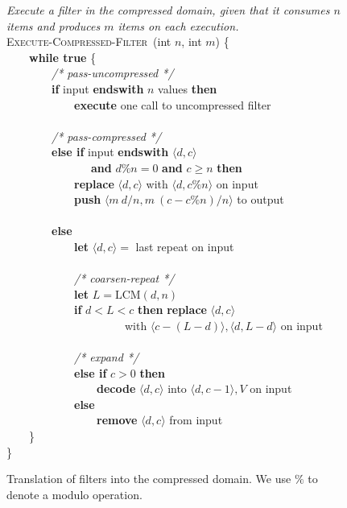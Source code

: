 \newcommand{\mynewline}[0]{\\}
\begin{figure}[t]
\vspace{-6pt}
\centering
\begin{minipage}{0.62\textwidth}
{\it Execute a filter in the compressed domain, given that it consumes
  $n$ items and produces $m$ items on each execution.}\mynewline
\textsc{Execute-Compressed-Filter}~(int $n$, int $m$) \{\mynewline
\mbox{~~~~}{\bf while true} \{\mynewline
\mbox{~~~~}\mbox{~~~~}{\it /* pass-uncompressed */} \mynewline
\mbox{~~~~}\mbox{~~~~}{\bf if} input {\bf endswith} $n$ values {\bf then}\mynewline
\mbox{~~~~}\mbox{~~~~}\mbox{~~~~}{\bf execute} one call to uncompressed filter\mynewline
\mbox{~~~~}\mbox{~~~~}~\mynewline
\mbox{~~~~}\mbox{~~~~}{\it /* pass-compressed */} \mynewline
\mbox{~~~~}\mbox{~~~~}{\bf else if} input {\bf endswith} $\langle d,c \rangle$\mynewline
\mbox{~~~~}\mbox{~~~~}\mbox{~~~~~~~}{\bf and} $d\%n = 0$ {\bf and} $c \geq n$ {\bf then}\mynewline
\mbox{~~~~}\mbox{~~~~}\mbox{~~~~}{\bf replace} $\langle d,c \rangle$ with $\langle d, c\%n\rangle$ on input\mynewline
\mbox{~~~~}\mbox{~~~~}\mbox{~~~~}{\bf push} $\langle m~d/n, m~(c-c\%n)/n \rangle$ to output\mynewline
\mbox{~~~~}\mbox{~~~~}~\mynewline
\mbox{~~~~}\mbox{~~~~}{\bf else}\mynewline
\mbox{~~~~}\mbox{~~~~}\mbox{~~~~}{\bf let} $\langle d,c \rangle = $ last repeat on input\mynewline
\mbox{~~~~}\mbox{~~~~}\mynewline
\mbox{~~~~}\mbox{~~~~}\mbox{~~~~}{\it /* coarsen-repeat */}\mynewline
\mbox{~~~~}\mbox{~~~~}\mbox{~~~~}{\bf let} $L = \mbox{LCM}(d, n)$\mynewline
\mbox{~~~~}\mbox{~~~~}\mbox{~~~~}{\bf if} $d < L < c$ {\bf then} {\bf replace} $\langle d,c \rangle$\mynewline
\mbox{~~~~}\mbox{~~~~}\mbox{~~~~}\mbox{~~~~}\mbox{~~~~~}with $\langle c - (L - d) \rangle, \langle d, L - d\rangle$ on input\mynewline
\mbox{~~~~}\mbox{~~~~}\mynewline
\mbox{~~~~}\mbox{~~~~}\mbox{~~~~}{\it /* expand */}\mynewline
\mbox{~~~~}\mbox{~~~~}\mbox{~~~~}{\bf else if} $c > 0$ {\bf then}\mynewline
\mbox{~~~~}\mbox{~~~~}\mbox{~~~~}\mbox{~~~~}{\bf decode} $\langle d,c \rangle$ into $\langle d,c-1\rangle,V$ on input\mynewline
\mbox{~~~~}\mbox{~~~~}\mbox{~~~~}{\bf else}\mynewline
\mbox{~~~~}\mbox{~~~~}\mbox{~~~~}\mbox{~~~~}{\bf remove} $\langle d,c \rangle$ from input\mynewline
\mbox{~~~~}\}\mynewline
\}\mynewline
\end{minipage}
\vspace{-6pt}
\caption[Translation of filters into the compressed
  domain]{Translation of filters into the compressed domain.  We use
  $\%$ to denote a modulo operation.
\protect\label{fig:translate-filter}}
\end{figure}


